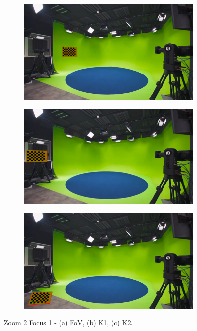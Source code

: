 \begin{figure}[h]
    \centering
    \begin{subfigure}[b]{0.45\textwidth}
        \includegraphics[width=\textwidth]{Images/08annex/results/3.2.png}
        \caption{}
        \label{fig:a23}
    \end{subfigure}
    \hfill
    \begin{subfigure}[b]{0.45\textwidth}
        \includegraphics[width=\textwidth]{Images/08annex/results/3.3.png}
        \caption{}
        \label{fig:b2}
    \end{subfigure}
    
    \vspace{0.5cm}
    
    \begin{subfigure}[b]{0.45\textwidth}
        \includegraphics[width=\textwidth]{Images/08annex/results/3.4.png}
        \caption{}
        \label{fig:c2}
    \end{subfigure}

    \caption{Zoom 2 Focus 1 - (a) FoV, (b) K1, (c) K2.}
    \label{fig:vir_fov_cal}
\end{figure}

